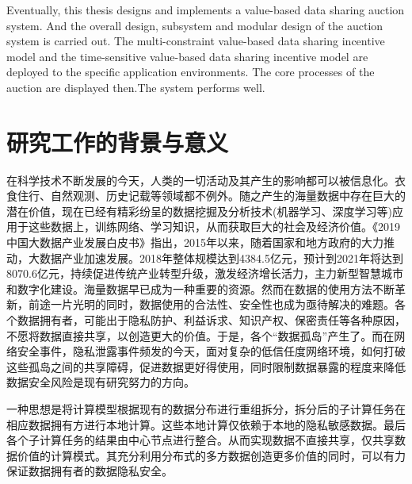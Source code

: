 \documentclass[promaster]{thesis-uestc}
\begin{document}
\begin{englishabstract}
Eventually, this thesis designs and implements a value-based data sharing auction system. And the overall design, subsystem and modular design of the auction system is carried out. The multi-constraint value-based data sharing incentive model and the time-sensitive value-based data sharing incentive model are deployed to the specific application environments. The core processes of the auction are displayed then.The system performs well.

\end{englishabstract}

\thesistableofcontents

\thesischapterexordium

\section{研究工作的背景与意义}

在科学技术不断发展的今天，人类的一切活动及其产生的影响都可以被信息化。衣食住行、自然观测、历史记载等领域都不例外。随之产生的海量数据中存在巨大的潜在价值，现在已经有精彩纷呈的数据挖掘及分析技术(机器学习、深度学习等)应用于这些数据上，训练网络、学习知识，从而获取巨大的社会及经济价值。《2019中国大数据产业发展白皮书》指出，2015年以来，随着国家和地方政府的大力推动，大数据产业加速发展。2018年整体规模达到4384.5亿元，预计到2021年将达到8070.6亿元，持续促进传统产业转型升级，激发经济增长活力，主力新型智慧城市和数字化建设。海量数据早已成为一种重要的资源。然而在数据的使用方法不断革新，前途一片光明的同时，数据使用的合法性、安全性也成为亟待解决的难题。各个数据拥有者，可能出于隐私防护、利益诉求、知识产权、保密责任等各种原因，不愿将数据直接共享，以创造更大的价值。于是，各个“数据孤岛”产生了。而在网络安全事件，隐私泄露事件频发的今天，面对复杂的低信任度网络环境，如何打破这些孤岛之间的共享障碍，促进数据更好得使用，同时限制数据暴露的程度来降低数据安全风险是现有研究努力的方向。

一种思想是将计算模型根据现有的数据分布进行重组拆分，拆分后的子计算任务在相应数据拥有方进行本地计算。这些本地计算仅依赖于本地的隐私敏感数据。最后各个子计算任务的结果由中心节点进行整合。从而实现数据不直接共享，仅共享数据价值的计算模式。其充分利用分布式的多方数据创造更多价值的同时，可以有力保证数据拥有者的数据隐私安全。

\end{document}
